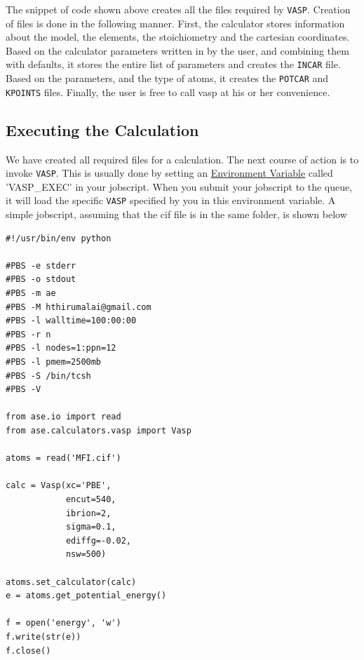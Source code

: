 \documentclass[11pt]{article}
\begin{document}
The snippet of code shown above creates all the files required by \texttt{VASP}. Creation of files is done in the following manner. First, the calculator stores information about the model, the elements, the stoichiometry and the cartesian coordinates. Based on the calculator parameters written in by the user, and combining them with defaults, it stores the entire list of parameters and creates the \texttt{INCAR} file. Based on the parameters, and the type of atoms, it creates the \texttt{POTCAR} and \texttt{KPOINTS} files. Finally, the user is free to call vasp at his or her convenience. 

\subsection{Executing the Calculation}
\label{sec-4-3}
We have created all required files for a calculation. The next course of action is to invoke \texttt{VASP}. This is usually done by setting an \href{https://en.wikipedia.org/wiki/Environment_variable}{Environment Variable} called 'VASP\_EXEC' in your jobscript. When you submit your jobscript to the queue, it will load the specific \texttt{VASP} specified by you in this environment variable. A simple jobscript, assuming that the cif file is in the same folder, is shown below

\begin{verbatim}
#!/usr/bin/env python

#PBS -e stderr
#PBS -o stdout
#PBS -m ae
#PBS -M hthirumalai@gmail.com
#PBS -l walltime=100:00:00
#PBS -r n
#PBS -l nodes=1:ppn=12
#PBS -l pmem=2500mb
#PBS -S /bin/tcsh
#PBS -V

from ase.io import read
from ase.calculators.vasp import Vasp

atoms = read('MFI.cif')

calc = Vasp(xc='PBE',
            encut=540,
            ibrion=2,
            sigma=0.1,
            ediffg=-0.02,
            nsw=500)

atoms.set_calculator(calc)
e = atoms.get_potential_energy()

f = open('energy', 'w')
f.write(str(e))
f.close()
\end{verbatim}
\end{document}
